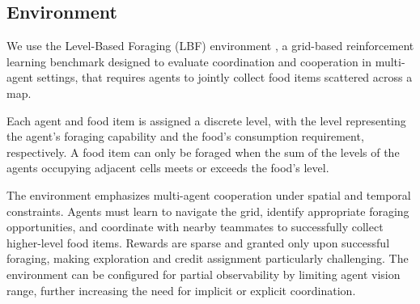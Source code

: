 \documentclass{article}
\begin{document}
    
    
    \subsection{Environment}
    
    We use the Level-Based Foraging (LBF) environment \cite{papoudakis2021},
    a grid-based reinforcement learning benchmark designed to evaluate 
    coordination and cooperation in multi-agent settings,
    that requires agents to jointly collect food items scattered across a map. 
    
    Each agent and food item is assigned a discrete level, with the level representing 
    the agent's foraging capability and the food's consumption requirement, respectively.
    A food item can only be foraged when the sum of the levels of the agents 
    occupying adjacent cells meets or exceeds the food's level.
    
    The environment emphasizes multi-agent cooperation under spatial and temporal constraints. 
    Agents must learn to navigate the grid, identify appropriate foraging opportunities, 
    and coordinate with nearby teammates to successfully collect higher-level food items. 
    Rewards are sparse and granted only upon successful foraging, 
    making exploration and credit assignment particularly challenging. 
    The environment can be configured for partial observability by limiting agent vision range, 
    further increasing the need for implicit or explicit coordination.


\printbibliography
\end{document}
